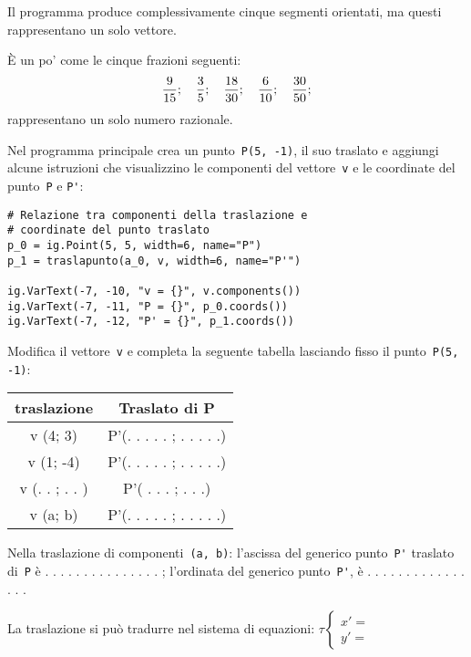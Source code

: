 Il programma produce complessivamente cinque segmenti orientati,
ma questi rappresentano un solo vettore.

È un po' come le cinque frazioni seguenti:
\begin{gather}
\begin{split}\frac{9}{15}; \quad \frac{3}{5}; \quad\frac{18}{30};
\quad\frac{6}{10}; \quad\frac{30}{50};\end{split}\notag
\end{gather}
rappresentano un solo numero razionale.

Nel programma principale crea un punto~\lstinline{P(5, -1)}, il suo traslato e
aggiungi alcune istruzioni che visualizzino le
componenti del vettore~\lstinline{v} e le coordinate del punto~\lstinline{P} e 
\lstinline{P'}:

\begin{lstlisting}
# Relazione tra componenti della traslazione e
# coordinate del punto traslato
p_0 = ig.Point(5, 5, width=6, name="P")
p_1 = traslapunto(a_0, v, width=6, name="P'")

ig.VarText(-7, -10, "v = {}", v.components())
ig.VarText(-7, -11, "P = {}", p_0.coords())
ig.VarText(-7, -12, "P' = {}", p_1.coords())
\end{lstlisting}

Modifica il vettore~\lstinline{v} e completa la seguente tabella
lasciando fisso il punto~\lstinline{P(5, -1)}:

\begin{tabular}{|c|c|}
\hline

traslazione
 & 
Traslato di P
\\
\hline
v (4; 3)
 & 
P'(. . . . . ; . . . . .)
\\
\hline
v (1; -4)
 & 
P'(. . . . . ; . . . . .)
\\
\hline
v (. . ; . . )
 & 
P'( . . . ;  . . .)
\\
\hline
v (a; b)
 & 
P'(. . . . . ; . . . . .)
\\
\hline\end{tabular}


Nella traslazione di componenti~\lstinline{(a, b)}:
l'ascissa del generico punto~\lstinline{P'} traslato di~\lstinline{P}
è . . . . . . . . . . . . . . . ;
l'ordinata del generico punto~\lstinline{P'},
è . . . . . . . . . . . . . . . .

La traslazione si può tradurre nel sistema di equazioni:
\(\tau \left \{
\begin{array}{l}
x' =  \\
y' =
\end{array} \right .\)

